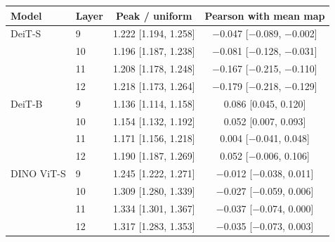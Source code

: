 \begin{tabular}{llcc}
\toprule
Model & Layer & Peak / uniform & Pearson with mean map \\
\midrule
DeiT-S & 9 & 1.222 {\scriptsize [1.194, 1.258]} & $-$0.047 {\scriptsize [$-$0.089, $-$0.002]} \\
 & 10 & 1.196 {\scriptsize [1.187, 1.238]} & $-$0.081 {\scriptsize [$-$0.128, $-$0.031]} \\
 & 11 & 1.208 {\scriptsize [1.178, 1.248]} & $-$0.167 {\scriptsize [$-$0.215, $-$0.110]} \\
 & 12 & 1.218 {\scriptsize [1.173, 1.264]} & $-$0.179 {\scriptsize [$-$0.218, $-$0.129]} \\
\midrule
DeiT-B & 9 & 1.136 {\scriptsize [1.114, 1.158]} & 0.086 {\scriptsize [0.045, 0.120]} \\
 & 10 & 1.154 {\scriptsize [1.132, 1.192]} & 0.052 {\scriptsize [0.007, 0.093]} \\
 & 11 & 1.171 {\scriptsize [1.156, 1.218]} & 0.004 {\scriptsize [$-$0.041, 0.048]} \\
 & 12 & 1.190 {\scriptsize [1.187, 1.269]} & 0.052 {\scriptsize [$-$0.006, 0.106]} \\
\midrule
DINO ViT-S & 9 & 1.245 {\scriptsize [1.222, 1.271]} & $-$0.012 {\scriptsize [$-$0.038, 0.011]} \\
 & 10 & 1.309 {\scriptsize [1.280, 1.339]} & $-$0.027 {\scriptsize [$-$0.059, 0.006]} \\
 & 11 & 1.334 {\scriptsize [1.301, 1.367]} & $-$0.037 {\scriptsize [$-$0.074, 0.000]} \\
 & 12 & 1.317 {\scriptsize [1.283, 1.353]} & $-$0.035 {\scriptsize [$-$0.073, 0.003]} \\
\bottomrule
\end{tabular}
